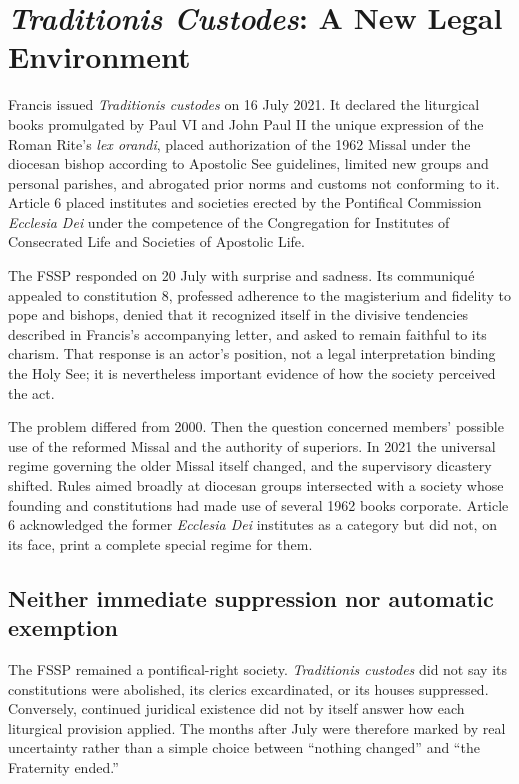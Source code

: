 \section{\emph{Traditionis Custodes}: A New Legal Environment}

Francis issued \emph{Traditionis custodes} on 16 July 2021. It declared the liturgical books promulgated by Paul VI and John Paul II the unique expression of the Roman Rite's \emph{lex orandi}, placed authorization of the 1962 Missal under the diocesan bishop according to Apostolic See guidelines, limited new groups and personal parishes, and abrogated prior norms and customs not conforming to it. Article 6 placed institutes and societies erected by the Pontifical Commission \emph{Ecclesia Dei} under the competence of the Congregation for Institutes of Consecrated Life and Societies of Apostolic Life.

The FSSP responded on 20 July with surprise and sadness. Its communiqué appealed to constitution 8, professed adherence to the magisterium and fidelity to pope and bishops, denied that it recognized itself in the divisive tendencies described in Francis's accompanying letter, and asked to remain faithful to its charism. That response is an actor's position, not a legal interpretation binding the Holy See; it is nevertheless important evidence of how the society perceived the act.

The problem differed from 2000. Then the question concerned members' possible use of the reformed Missal and the authority of superiors. In 2021 the universal regime governing the older Missal itself changed, and the supervisory dicastery shifted. Rules aimed broadly at diocesan groups intersected with a society whose founding and constitutions had made use of several 1962 books corporate. Article 6 acknowledged the former \emph{Ecclesia Dei} institutes as a category but did not, on its face, print a complete special regime for them.

\subsection{Neither immediate suppression nor automatic exemption}

The FSSP remained a pontifical-right society. \emph{Traditionis custodes} did not say its constitutions were abolished, its clerics excardinated, or its houses suppressed. Conversely, continued juridical existence did not by itself answer how each liturgical provision applied. The months after July were therefore marked by real uncertainty rather than a simple choice between ``nothing changed'' and ``the Fraternity ended.''

